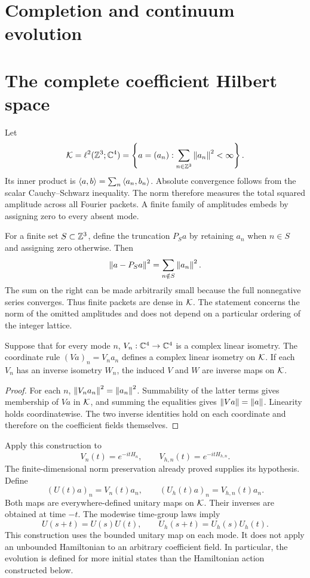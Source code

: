 \clearpage
\section*{Completion and continuum evolution}
\section{The complete coefficient Hilbert space}
Let
\[
\mathcal K=\ell^2(\mathbb Z^3;\mathbb C^4)
=\left\{a=(a_n):\sum_{n\in\mathbb Z^3}\left\lVert a_n\right\rVert^2<\infty\right\}.
\]
Its inner product is $\left\langle a,b\right\rangle=\sum_n\left\langle a_n,b_n\right\rangle$. Absolute convergence follows from the scalar Cauchy--Schwarz inequality. The norm therefore measures the total squared amplitude across all Fourier packets. A finite family of amplitudes embeds by assigning zero to every absent mode.

For a finite set $S\subset\mathbb Z^3$, define the truncation $P_Sa$ by retaining $a_n$ when $n\in S$ and assigning zero otherwise. Then
\[
\left\lVert a-P_Sa\right\rVert^2=\sum_{n\notin S}\left\lVert a_n\right\rVert^2.
\]
The sum on the right can be made arbitrarily small because the full nonnegative series converges. Thus finite packets are dense in $\mathcal K$. The statement concerns the norm of the omitted amplitudes and does not depend on a particular ordering of the integer lattice.

\begin{theorem}
Suppose that for every mode $n$, $V_n:\mathbb C^4\to\mathbb C^4$ is a complex linear isometry. The coordinate rule $(Va)_n=V_na_n$ defines a complex linear isometry on $\mathcal K$. If each $V_n$ has an inverse isometry $W_n$, the induced $V$ and $W$ are inverse maps on $\mathcal K$.
\end{theorem}
\begin{proof}
For each $n$, $\left\lVert V_na_n\right\rVert^2=\left\lVert a_n\right\rVert^2$. Summability of the latter terms gives membership of $Va$ in $\mathcal K$, and summing the equalities gives $\left\lVert Va\right\rVert=\left\lVert a\right\rVert$. Linearity holds coordinatewise. The two inverse identities hold on each coordinate and therefore on the coefficient fields themselves.
\end{proof}


Apply this construction to
\[
V_n(t)=e^{-itH_n},\qquad V_{h,n}(t)=e^{-itH_{h,n}}.
\]
The finite-dimensional norm preservation already proved supplies its hypothesis. Define
\[
(U(t)a)_n=V_n(t)a_n,\qquad (U_h(t)a)_n=V_{h,n}(t)a_n.
\]
Both maps are everywhere-defined unitary maps on $\mathcal K$. Their inverses are obtained at time $-t$. The modewise time-group laws imply
\[
U(s+t)=U(s)U(t),\qquad U_h(s+t)=U_h(s)U_h(t).
\]
This construction uses the bounded unitary map on each mode. It does not apply an unbounded Hamiltonian to an arbitrary coefficient field. In particular, the evolution is defined for more initial states than the Hamiltonian action constructed below.

